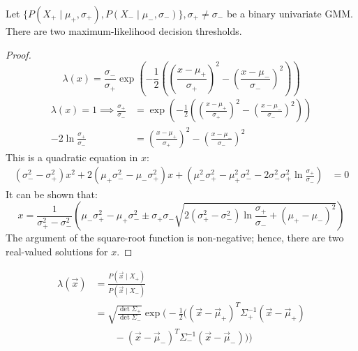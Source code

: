 \begin{proposition}
  Let $\{ P(X_+ \mid \mu_+, \sigma_+), P(X_- \mid \mu_-, \sigma_-) \}, \sigma_+ \neq \sigma_-$
  be a binary univariate GMM.
  There are two maximum-likelihood decision thresholds.
  \begin{proof}
    \begin{equation*}
      \lambda(x)
      = \frac{\sigma_-}{\sigma_+}\exp\left(-\frac{1}{2}\left(
        \left(\frac{x - \mu_+}{\sigma_+} \right)^2 -
        \left(\frac{x - \mu_-}{\sigma_-} \right)^2
        \right)\right)
    \end{equation*}
    \begin{align*}
      \lambda(x) = 1 \implies \frac{\sigma_+}{\sigma_-}
       & = \exp\left(-\frac{1}{2}\left(
        \left(\frac{x - \mu_+}{\sigma_+} \right)^2 -
        \left(\frac{x - \mu_-}{\sigma_-} \right)^2
      \right)\right)                                    \\[2ex]
      -2 \ln \frac{\sigma_+}{\sigma_-}
       & = \left(\frac{x - \mu_+}{\sigma_+} \right)^2 -
      \left(\frac{x - \mu_-}{\sigma_-} \right)^2
    \end{align*}
    This is a quadratic equation in $x$:
    \begin{align*}
      \left(\sigma_-^2 - \sigma_+^2\right) x^2
      + 2\left(\mu_+\sigma_-^2 - \mu_-\sigma_+^2\right) x
      + \left(
      \mu_-^2\sigma_+^2 -
      \mu_+^2\sigma_-^2 -
      2\sigma_-^2\sigma_+^2\ln\frac{\sigma_+}{\sigma_-}
      \right)
       & = 0
    \end{align*}
    It can be shown that:
    \begin{equation*}
      x = \frac{1}{\sigma_+^2 - \sigma_-^2}\left(
      \mu_-\sigma_+^2 - \mu_+\sigma_-^2 \pm
      \sigma_+\sigma_-\sqrt{
          2(\sigma_+^2 - \sigma_-^2)\ln\frac{\sigma_+}{\sigma_-} +
          (\mu_+ - \mu_-)^2
        }
      \right)
    \end{equation*}
    The argument of the square-root function is non-negative; hence, there are
    two real-valued solutions for $x$.
  \end{proof}
\end{proposition}

\begin{proposition}
  \begin{align*}
    \lambda(\vec{x})
     & = \frac{P(\vec{x} \mid X_+)}{P(\vec{x} \mid X_-)}                                                \\[2ex]
     & = \sqrt{\frac{\det\Sigma_+}{\det\Sigma_-}} \exp \Bigg( -\frac{1}{2} \bigg(
    \left(\vec{x} - \vec{\mu}_+ \right)^T \Sigma_+^{-1} \left(\vec{x} - \vec{\mu}_+ \right)             \\
     & \qquad - \left(\vec{x} - \vec{\mu}_- \right)^T \Sigma_-^{-1} \left(\vec{x} - \vec{\mu}_- \right)
      \bigg) \Bigg)
  \end{align*}
\end{proposition}

